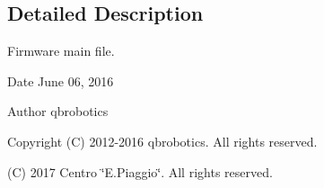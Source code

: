 \subsection{Detailed Description}
Firmware main file. 

\begin{DoxyDate}{Date}
June 06, 2016 
\end{DoxyDate}
\begin{DoxyAuthor}{Author}
qbrobotics 
\end{DoxyAuthor}
\begin{DoxyCopyright}{Copyright}
(C) 2012-\/2016 qbrobotics. All rights reserved. 

(C) 2017 Centro \char`\"{}\+E.\+Piaggio\char`\"{}. All rights reserved. 
\end{DoxyCopyright}
